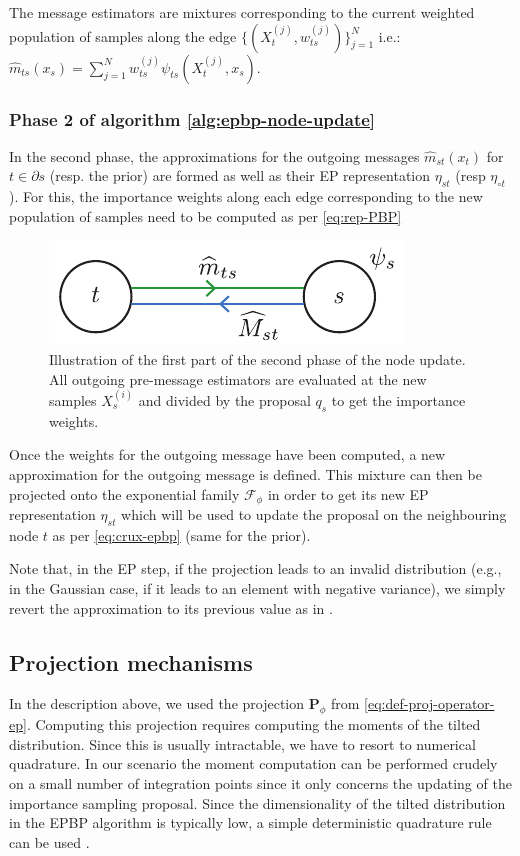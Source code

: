 The message estimators are mixtures corresponding to the current weighted population of samples along the edge $\{(X^{(j)}_{t}, w^{(j)}_{ts})\}_{j=1}^{N}$ i.e.: $\widehat m_{ts}(x_{s}) = \sum_{j=1}^{N} w^{(j)}_{ts} \psi_{ts}(X^{(j)}_{t}, x_{s})$.

\subsubsection{Phase 2 of algorithm \ref{alg:epbp-node-update}}
In the second phase, the approximations for the outgoing messages $\widehat m_{st}(x_{t})$ for $t\in\partial s$ (resp. the prior) are formed as well as their EP representation $\eta_{st}$ (resp $\eta_{\circ t}$). 
For this, the importance weights along each edge corresponding to the new population of samples need to be computed as per \eqref{eq:rep-PBP}
%
\begin{figure}[!h]
\center
\includegraphics[width=.4\textwidth]{./figures/extra/epbp-ill-2}
\caption{\label{fig:epbp-ill-1} Illustration of the first part of the second phase of the node update. All outgoing pre-message estimators are evaluated at the new samples $X^{(i)}_{s}$ and divided by the proposal $q_{s}$ to get the importance weights.}
\end{figure}
%
Once the weights for the outgoing message have been computed, a new approximation for the outgoing message is defined.
This mixture can then be projected onto the exponential family $\mathcal F_{\phi}$ in order to get its new EP representation $\eta_{st}$ which will be used to update the proposal on the neighbouring node $t$ as per \eqref{eq:crux-epbp} (same for the prior).

Note that, in the EP step, if the projection leads to an invalid distribution (e.g., in the Gaussian case, if it leads to an element with negative variance), we simply revert the approximation to its previous value as in \citet{minka01}. %

\subsection{\label{point:epbp-proj}Projection mechanisms}

In the description above, we used the projection $\mathbf P_{\phi}$ from \ref{eq:def-proj-operator-ep}. 
Computing this projection requires computing the moments of the tilted distribution. 
Since this is usually intractable, we have to resort to numerical quadrature. 
In our scenario the moment computation can be performed crudely on a small number of integration points since it only concerns the updating of the importance sampling proposal. 
Since the dimensionality of the tilted distribution in the EPBP algorithm is typically low, a simple deterministic quadrature rule can be used \citep{davis75}. 


